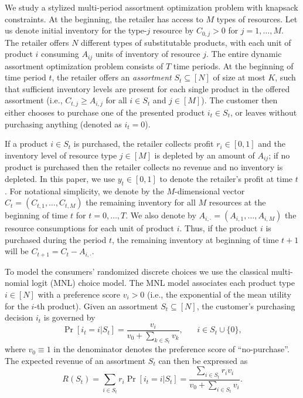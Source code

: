 \documentclass[opre]{informs3aa}
\newcommand{\Authornote}[2]{{\small\textcolor{DSgray}{\sf$<<<${  #1: #2
			}$>>>$}}}
\newcommand{\xnote}[1]{{\Authornote{Xi}{#1}}}
\begin{document}
We study a stylized multi-period assortment optimization problem with knapsack constraints.
At the beginning, the retailer has access to $M$ types of resources. Let us denote  initial inventory for the type-$j$ resource by $C_{0,j}>0$ for $j=1,\ldots, M$.
The retailer offers $N$ different types of substitutable products, with each unit of product $i$ consuming $A_{ij}$ units of inventory of resource $j$.
The entire dynamic assortment optimization problem consists of $T$ time periods.
At the beginning of time period $t$, the retailer offers an \emph{assortment} $S_t\subseteq[N]$ of size at most $K$,
such that sufficient inventory levels are present for each single product in the offered assortment (i.e., $C_{t,j}\geq A_{i,j}$ for all $i\in S_t$ and $j\in[M]$).
The customer then either chooses to purchase one of the presented product $i_t\in S_t$, or leaves without purchasing anything (denoted as $i_t=0$).


If a product $i\in S_t$ is purchased,  the retailer collects profit $r_i\in[0,1]$ and the inventory level of resource type $j\in[M]$ is depleted by an amount of $A_{ij}$; if no product is purchased then the retailer collects no revenue and no inventory is depleted. In this paper, we use $y_t\in[0,1]$ to denote the retailer's profit at time $t$.
  {For notational simplicity, we denote by the $M$-dimensional vector $C_t=(C_{t,1},\ldots, C_{t,M})$ the remaining inventory for all $M$ resources at the beginning of time $t$ for $t=0,\ldots, T$. We also denote by $A_{i,\cdot}=(A_{i,1},\ldots, A_{i,M})$ the resource consumptions for each unit of product $i$.  Thus, if the product $i$ is purchased during the period $t$, the remaining inventory at beginning of time $t+1$ will be $C_{t+1}=C_t-A_{i,\cdot}$.	
}



To model the consumers' randomized discrete choices we use the classical multi-nomial logit (MNL) choice model.
The MNL model associates each product type $i\in[N]$ with a preference score  $v_i>0$ (i.e., the exponential of the mean utility for the $i$-th product).
Given an assortment $S_t\subseteq[N]$, the customer's purchasing decision $i_t$ is governed by 
\begin{equation}
\Pr[i_t=i|S_t] = \frac{v_i}{v_0 + \sum_{k\in S_t}v_k},\;\;\;\;\;\;i\in S_t\cup\{0\},
\label{eq:defn-mnl}
\end{equation}
where $v_0 \equiv 1$ in the denominator denotes the preference score of ``no-purchase''. 
The expected revenue of an assortment $S_t$ can then be expressed as
\begin{equation}
R(S_t)=\sum_{i\in S_t}r_i\Pr[i_t=i|S_t] =\frac{\sum_{ i \in S_t }r_i v_i}{v_0 + \sum_{i \in S_t}v_i}.
\label{eq:defn-R}
\end{equation}
 
\end{document}
